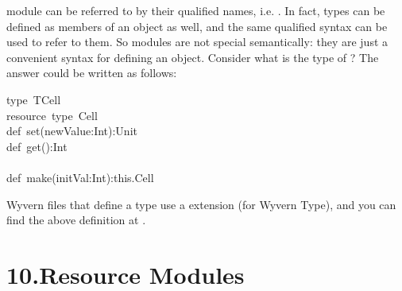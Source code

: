\documentclass{article}
\begin{document}
module can be referred to by their qualified names, i.e. .
In fact, types can be defined as members of an object as well, and the
same qualified syntax can be used to refer to them.  So modules are not
special semantically: they are just a convenient syntax for defining an
object.  Consider what is the type of ?  The answer could be
written as follows:
\begin{mdpre}%
\noindent type~TCell\\
resource~type~Cell\\
def~set(newValue:Int):Unit\\
def~get():Int\\
\\
def~make(initVal:Int):this.Cell%
\end{mdpre}\noindent{}Wyvern files that define a type use a  extension (for Wyvern Type),
and you can find the above definition at .

\section{10.\hspace*{0.5em}Resource Modules}\label{sec-resource-modules}%
\end{document}

